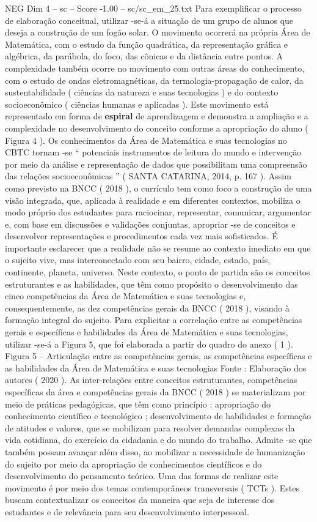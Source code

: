 \begin{textsample}{NEG Dim 4 – sc – Score -1.00 – sc/sc\_em\_25.txt}
Para exemplificar o processo de elaboração conceitual, utilizar -se-á a situação de um grupo de alunos que deseja a construção de um fogão solar.
O movimento ocorrerá na própria Área de Matemática, com o estudo da função quadrática, da representação gráfica e algébrica, da parábola, do foco, das cônicas e da distância entre pontos.
A complexidade também ocorre no movimento com outras áreas do conhecimento, com o estudo de ondas eletromagnéticas, da termologia-propagação de calor, da sustentabilidade ( ciências da natureza e suas tecnologias ) e do contexto socioeconômico ( ciências humanas e aplicadas ).
Este movimento está representado em forma de \textbf{espiral} de aprendizagem e demonstra a ampliação e a complexidade no desenvolvimento do conceito conforme a apropriação do aluno ( Figura 4 ).
Os conhecimentos da Área de Matemática e suas tecnologias no CBTC tornam -se “ potenciais instrumentos de leitura do mundo e intervenção por meio da análise e representação de dados que possibilitam uma compreensão das relações socioeconômicas ” ( SANTA CATARINA, 2014, p. 167 ).
Assim como previsto na BNCC ( 2018 ), o currículo tem como foco a construção de uma visão integrada, que, aplicada à realidade e em diferentes contextos, mobiliza o modo próprio dos estudantes para raciocinar, representar, comunicar, argumentar e, com base em discussões e validações conjuntas, apropriar -se de conceitos e desenvolver representações e procedimentos cada vez mais sofisticados.
É importante esclarecer que a realidade não se resume ao contexto imediato em que o sujeito vive, mas interconectado com seu bairro, cidade, estado, país, continente, planeta, universo.
Neste contexto, o ponto de partida são os conceitos estruturantes e as habilidades, que têm como propósito o desenvolvimento das cinco competências da Área de Matemática e suas tecnologias e, consequentemente, as dez competências gerais da BNCC ( 2018 ), visando à formação integral do sujeito.
Para explicitar a correlação entre as competências gerais e específicas e habilidades da Área de Matemática e suas tecnologias, utilizar -se-á a Figura 5, que foi elaborada a partir do quadro do anexo ( 1 ).
Figura 5 – Articulação entre as competências gerais, as competências específicas e as habilidades da Área de Matemática e suas tecnologias Fonte : Elaboração dos autores ( 2020 ).
As inter-relações entre conceitos estruturantes, competências específicas da área e competências gerais da BNCC ( 2018 ) se materializam por meio de práticas pedagógicas, que têm como princípio : apropriação do conhecimento científico e tecnológico ; desenvolvimento de habilidades e formação de atitudes e valores, que se mobilizam para resolver demandas complexas da vida cotidiana, do exercício da cidadania e do mundo do trabalho.
Admite -se que também possam avançar além disso, ao mobilizar a necessidade de humanização do sujeito por meio da apropriação de conhecimentos científicos e do desenvolvimento do pensamento teórico.
Uma das formas de realizar este movimento é por meio dos temas contemporâneos transversais ( TCTs ).
Estes buscam contextualizar os conceitos da maneira que seja de interesse dos estudantes e de relevância para seu desenvolvimento interpessoal.

\end{textsample}
